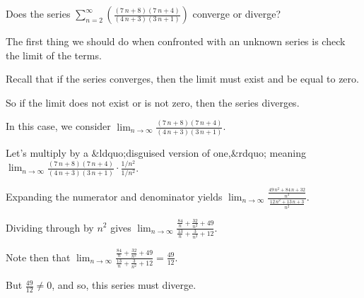 \documentclass{ximera}
\begin{document}
\begin{question}
  Does the series \(\displaystyle\sum_{n=2}^\infty \left( \displaystyle\frac{{\left(7 \, n + 8\right)} {\left(7 \, n + 4\right)}}{{\left(4 \, n + 3\right)} {\left(3 \, n + 1\right)}} \right)\) converge or diverge?

  \begin{solution}
    \begin{hint}
      The first thing we should do when confronted with an unknown series is check the limit of the terms.
    \end{hint}
    \begin{hint}
      Recall that if the series converges, then the limit must exist and be equal to zero.
    \end{hint}
    \begin{hint}
      So if the limit does not exist or is not zero, then the series diverges.
    \end{hint}
    \begin{hint}
      In this case, we consider \(\displaystyle\lim_{n \to \infty} \displaystyle\frac{{\left(7 \, n + 8\right)} {\left(7 \, n + 4\right)}}{{\left(4 \, n + 3\right)} {\left(3 \, n + 1\right)}}\).
    \end{hint}
    \begin{hint}
      Let's multiply by a &ldquo;disguised version of one,&rdquo; meaning \(\displaystyle\lim_{n \to \infty} \displaystyle\frac{{\left(7 \, n + 8\right)} {\left(7 \, n + 4\right)}}{{\left(4 \, n + 3\right)} {\left(3 \, n + 1\right)}} \cdot \displaystyle\frac{1/n^{2}}{1/n^{2}}\).
    \end{hint}
    \begin{hint}
      Expanding the numerator and denominator yields \(\displaystyle\lim_{n \to \infty} \displaystyle\frac{\displaystyle\frac{49 \, n^{2} + 84 \, n + 32}{n^{2}}}{\displaystyle\frac{12 \, n^{2} + 13 \, n + 3}{n^{2}}}\).
    \end{hint}
    \begin{hint}
      Dividing through by \(n^{2}\) gives \(\displaystyle\lim_{n \to \infty} \displaystyle\frac{\displaystyle\frac{84}{n} + \displaystyle\frac{32}{n^{2}} + 49}{\displaystyle\frac{13}{n} + \displaystyle\frac{3}{n^{2}} + 12}\).
    \end{hint}
    \begin{hint}
      Note then that \(\displaystyle\lim_{n \to \infty} \displaystyle\frac{\displaystyle\frac{84}{n} + \displaystyle\frac{32}{n^{2}} + 49}{\displaystyle\frac{13}{n} + \displaystyle\frac{3}{n^{2}} + 12} = \displaystyle\frac{49}{12}\).
    \end{hint}
    \begin{hint}
      But \(\displaystyle\frac{49}{12} \neq 0\), and so, this series must diverge.
      

\end{hint}
\end{solution}
\end{question}
\end{document}
